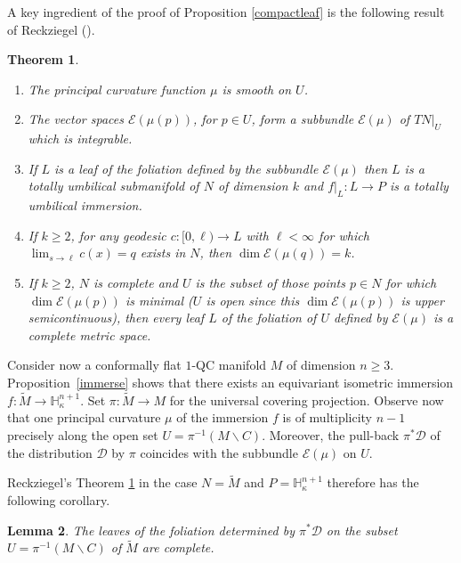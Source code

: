 \documentclass[10pt]{amsart}
\let\mathcal\mathscr
\let\moins\smallsetminus
\newtheorem{theorem}{Theorem}[section]
\newtheorem{lemma}[theorem]{Lemma}
\theoremstyle{definition}
\theoremstyle{remark}
\numberwithin{equation}{section}
\providecommand{\skpt}{\par\smallskip\noindent}
\begin{document}
A key ingredient of the proof of Proposition \ref{compactleaf} is the following result of Reckziegel (\cite[Th.\,1.1, Rem.\,1,\,2]{Re}).

\skpt
\begin{theorem}\label{Reckziegel}
\begin{enumerate}
\item The principal curvature function $\mu$ is smooth on $U$.
\item The vector spaces $\mathcal E(\mu(p))$, for $p\in U$, form a subbundle $\mathcal E(\mu)$ of $TN|_U$ which is integrable.
\item If $L$ is a leaf of the foliation defined by the subbundle $\mathcal E(\mu)$ then $L$ is a totally umbilical submanifold of $N$ of dimension $k$ and
$f|_L: L\to P$ is a totally umbilical immersion.
\item If $k\geq 2$,
for any geodesic $c:[0,\ell) \to L$ with $\ell\!<\!\infty$ for which \hbox{$\lim_{s \to \ell} c(x)\!=\!q$} exists in $N$, then $\dim \mathcal E(\mu(q))=k$.
\item If $k\geq 2$, $N$ is complete and $U$ is the subset of those points $p\in N$ for which $\dim \mathcal E(\mu(p))$ is minimal
($U$ is open since this $\dim \mathcal E(\mu(p))$ is upper semicontinuous), then
every leaf $L$ of the foliation of $U$ defined by $\mathcal E(\mu)$ is a complete metric space.
\end{enumerate}
\end{theorem}

Consider now a conformally flat $1$-QC manifold $M$ of dimension $n\geq3$.
Proposition~\ref{immerse} shows that there exists an equivariant isometric immersion
$f: \widetilde{M}\to \mathbb H_{\kappa}^{n+1}$. Set $\pi:\widetilde{M}\to M$ for the universal covering projection.
Observe now that one principal curvature $\mu$ of the immersion $f$ is of multiplicity $n-1$
precisely along the open set $U=\pi^{-1}(M\moins C)$. Moreover, the pull-back $\pi^{*}\mathcal D$ of the distribution $\mathcal D$
by $\pi$ coincides with the subbundle $\mathcal E(\mu)$ on $U$.

Reckziegel's Theorem \ref{Reckziegel} in the case
$N=\widetilde{M}$ and $P=\mathbb H_{\kappa}^{n+1}$ therefore has the following corollary.

\begin{lemma}\label{Reck}
The leaves of the foliation determined by $\pi^{*}\mathcal D$ on
the subset $U=\pi^{-1}(M\moins C)$ of $\widetilde{M}$ are complete.
\end{lemma}
\end{document}
